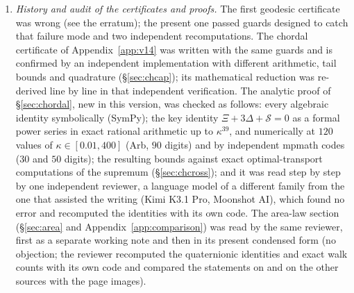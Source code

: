 \documentclass[11pt,a4paper]{article}
\theoremstyle{remark}
\theoremstyle{definition}
\theoremstyle{plain}
\theoremstyle{remark}
\begin{document}
\begin{enumerate}
``integrals $\to$ coefficient bounds'' (Arb, reduction of \S\ref{sec:reduction}) is outside Lean, and so are the
constant $0.0085$ and the covering of $[0,\pi]$ by the boxes (\S\ref{sec:cap}). The differential identity $R\,E\,\mathcal Q[\phi]=(R\,E\,\eta\,\phi^2)'$, the sum-of-squares algebra,
the moment and Riccati identities and the Chebyshev argument of \S\ref{sec:chordal} are natural candidates for formalisation; none was formalised. Kantorovich--Rubinstein duality is
quoted from \cite[Thm~10.8, p.~53]{DS25}; McShane's extension, the divergence theorem for Lipschitz fields, the
Holley--Stroock perturbation argument \cite{HS87} and the weak solvability of $-L\varphi=R$ (Lax--Milgram +
Poincar\'e) are standard and written out here; none of them is formalised. Wu's theorem, used in Corollary~\ref{cor:poincare}, is quoted, not reproved. The area law of \S\ref{sec:area} and Appendix~\ref{app:comparison}
(slab decomposition, Wasserstein comparison, walk count, factorisation of the loop) is proved on paper only; Lean covers none of it.
\item \emph{History and audit of the certificates and proofs.} The first geodesic certificate was wrong (see the erratum);
the present one passed guards designed to catch that failure mode and two independent recomputations. The chordal
certificate of Appendix~\ref{app:v14} was written with the same guards and is confirmed by an independent implementation with different
arithmetic, tail bounds and quadrature (\S\ref{sec:chcap}); its mathematical reduction was re-derived line by line
in that independent verification. The analytic proof of \S\ref{sec:chordal}, new in this version, was checked as follows: every algebraic identity
symbolically (SymPy); the key identity $\Xi+3\Delta+\mathcal S=0$ as a formal power series in exact rational arithmetic up to $\kappa^{39}$, and numerically at $120$ values of $\kappa\in[0.01,400]$ (Arb, $90$ digits)
and by independent mpmath codes ($30$ and $50$ digits); the resulting bounds against exact optimal-transport computations of the supremum (\S\ref{sec:chcross}); and it was read step by step by one independent reviewer,
a language model of a different family from the one that assisted the writing (Kimi K3.1 Pro, Moonshot AI), which found no error and recomputed the identities with its own code.
The area-law section (\S\ref{sec:area} and Appendix~\ref{app:comparison}) was read by the same reviewer, first as a separate working note and then in its present condensed form
(no objection; the reviewer recomputed the quaternionic identities and exact walk counts with its own code and compared the statements on \cite{BS83,DF80} and on the other sources with the page images).

\end{enumerate}
\end{document}
